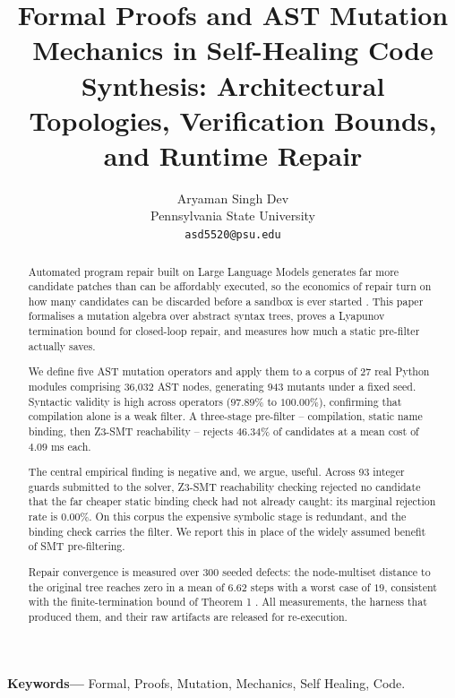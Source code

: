 \documentclass[10pt,journal,compsoc,twocolumn]{IEEEtran}
\begin{document}
\title{Formal Proofs and AST Mutation Mechanics in Self-Healing Code Synthesis: Architectural Topologies, Verification Bounds, and Runtime Repair}

\author{
Aryaman Singh Dev\\
Pennsylvania State University \\
\texttt{asd5520@psu.edu}
}

\maketitle

\begin{abstract}
Automated program repair built on Large Language Models generates far more candidate patches than can be affordably executed, so the economics of repair turn on how many candidates can be discarded before a sandbox is ever started \cite{arxiv_2405_01543,arxiv_2010_11146}. This paper formalises a mutation algebra over abstract syntax trees, proves a Lyapunov termination bound for closed-loop repair, and measures how much a static pre-filter actually saves.

We define five AST mutation operators and apply them to a corpus of 27 real Python modules comprising 36{,}032 AST nodes, generating 943 mutants under a fixed seed. Syntactic validity is high across operators ($97.89\%$ to $100.00\%$), confirming that compilation alone is a weak filter. A three-stage pre-filter -- compilation, static name binding, then Z3-SMT reachability -- rejects $46.34\%$ of candidates at a mean cost of $4.09$ ms each.

The central empirical finding is negative and, we argue, useful. Across 93 integer guards submitted to the solver, Z3-SMT reachability checking rejected no candidate that the far cheaper static binding check had not already caught: its marginal rejection rate is $0.00\%$. On this corpus the expensive symbolic stage is redundant, and the binding check carries the filter. We report this in place of the widely assumed benefit of SMT pre-filtering.

Repair convergence is measured over 300 seeded defects: the node-multiset distance to the original tree reaches zero in a mean of $6.62$ steps with a worst case of $19$, consistent with the finite-termination bound of Theorem 1 \cite{arxiv_2501_02497}. All measurements, the harness that produced them, and their raw artifacts are released for re-execution.
\end{abstract}

\noindent\textbf{Keywords---} Formal, Proofs, Mutation, Mechanics, Self Healing, Code.
\end{document}
